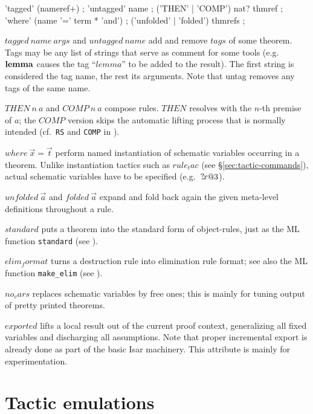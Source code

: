 \begin{rail}
  'tagged' (nameref+)
  ;
  'untagged' name
  ;
  ('THEN' | 'COMP') nat? thmref
  ;
  'where' (name '=' term * 'and')
  ;
  ('unfolded' | 'folded') thmrefs
  ;
\end{rail}

\begin{descr}
\item [$tagged~name~args$ and $untagged~name$] add and remove $tags$ of some
  theorem.  Tags may be any list of strings that serve as comment for some
  tools (e.g.\ ${\mathord{\mathbf{lemma}}}$ causes the tag ``$lemma$'' to be added to the
  result).  The first string is considered the tag name, the rest its
  arguments.  Note that untag removes any tags of the same name.
\item [$THEN~n~a$ and $COMP~n~a$] compose rules.  $THEN$ resolves with the
  $n$-th premise of $a$; the $COMP$ version skips the automatic lifting
  process that is normally intended (cf.\ \texttt{RS} and \texttt{COMP} in
  \cite[\S5]{isabelle-ref}).
\item [$where~\vec x = \vec t$] perform named instantiation of schematic
  variables occurring in a theorem.  Unlike instantiation tactics such as
  $rule_tac$ (see \S\ref{sec:tactic-commands}), actual schematic variables
  have to be specified (e.g.\ ${?\!x@3}$).
\item [$unfolded~\vec a$ and $folded~\vec a$] expand and fold back again the
  given meta-level definitions throughout a rule.
\item [$standard$] puts a theorem into the standard form of object-rules, just
  as the ML function \texttt{standard} (see \cite[\S5]{isabelle-ref}).
\item [$elim_format$] turns a destruction rule into elimination rule format;
  see also the ML function \texttt{make\_elim} (see \cite{isabelle-ref}).
\item [$no_vars$] replaces schematic variables by free ones; this is mainly
  for tuning output of pretty printed theorems.
\item [$exported$] lifts a local result out of the current proof context,
  generalizing all fixed variables and discharging all assumptions.  Note that
  proper incremental export is already done as part of the basic Isar
  machinery.  This attribute is mainly for experimentation.
\end{descr}


\section{Tactic emulations}\label{sec:tactics}

